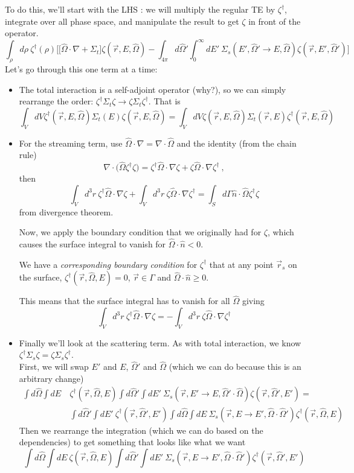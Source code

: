 \documentclass[12pt]{article}
\newcommand{\rvec}{\ensuremath{\vec{r}}}
\newcommand{\vOmega}{\ensuremath{\hat{\Omega}}}
\begin{document}
To do this, we'll start with the LHS : we will multiply the regular TE by $\zeta^{\dagger}$, integrate over all phase space, and manipulate the result to get $\zeta$ in front of the operator.
%
\[\int_{\rho} d\rho\: \zeta^{\dagger}(\rho)\biggl[ \bigl[\vOmega \cdot \nabla + \Sigma_t\bigr] \zeta(\vec{r}, E, \vOmega) - \int_{4 \pi} d\vOmega' \int_0^{\infty} dE' \: \Sigma_s(E', \vOmega' \rightarrow E, \vOmega) \zeta(\vec{r}, E', \vOmega') \biggr]\]
% 
Let's go through this one term at a time:
\begin{itemize}
\item The total interaction is a self-adjoint operator (why?), so we can simply rearrange the order: $\zeta^{\dagger} \Sigma_t \zeta \rightarrow \zeta \Sigma_t \zeta^{\dagger}$. That is
\[\int_V dV \zeta^{\dagger}(\vec{r}, E, \vOmega) \Sigma_t(E) \zeta(\vec{r}, E, \vOmega) = \int_V dV \zeta(\vec{r}, E, \vOmega) \Sigma_t(\rvec,E) \zeta^{\dagger}(\vec{r}, E, \vOmega)\]
%
\item For the streaming term, use $\vOmega \cdot \nabla = \nabla \cdot \vOmega$ and the identity (from the chain rule)
\[\nabla \cdot \bigl(\vOmega \zeta^{\dagger} \zeta \bigr) = \zeta^{\dagger}\vOmega \cdot \nabla \zeta + \zeta \vOmega \cdot \nabla \zeta^{\dagger}\:,\]
then
\[
\int_V d^3r \:\zeta^{\dagger}\vOmega \cdot \nabla \zeta + \int_V d^3r \:\zeta \vOmega \cdot \nabla \zeta^{\dagger} = \int_S d \Gamma \hat{n} \cdot \vOmega \zeta^{\dagger} \zeta
\]
from divergence theorem. 

Now, we apply the boundary condition that we originally had for $\zeta$, which causes the surface integral to vanish for $\vOmega \cdot \hat{n} < 0$.

We have a \textit{corresponding boundary condition} for $\zeta^{\dagger}$ that at any point $\rvec_s$ on the surface, $\zeta^{\dagger}(\rvec, \vOmega, E) = 0$, $\vec{r} \in \Gamma$ and $\vOmega \cdot \hat{n} \geq 0$.

This means that the surface integral has to vanish for all $\vOmega$ giving
\[
\int_V d^3r \:\zeta^{\dagger}\vOmega \cdot \nabla \zeta = -\int_V d^3r \:\zeta \vOmega \cdot \nabla \zeta^{\dagger}
\]
%
\item Finally we'll look at the scattering term. As with total interaction, we know $\zeta^{\dagger} \Sigma_s \zeta  = \zeta \Sigma_s \zeta^{\dagger}$. \\
First, we will swap $E'$ and $E$, $\vOmega'$ and $\vOmega$ (which we can do because this is an arbitrary change)
\begin{align*}
\int d\vOmega \int dE\: &\zeta^{\dagger}(\rvec, \vOmega, E) \int d\vOmega' \int dE'\: \Sigma_s(\rvec, E' \rightarrow E, \vOmega' \cdot \vOmega) \zeta(\rvec, \vOmega', E') = \\
%
&\int d\vOmega' \int dE'\: \zeta^{\dagger}(\rvec, \vOmega', E') \int d\vOmega \int dE\: \Sigma_s(\rvec, E \rightarrow E', \vOmega \cdot \vOmega') \zeta^{\dagger}(\rvec, \vOmega, E) 
\end{align*}
Then we rearrange the integration (which we can do based on the dependencies) to get something that looks like what we want
\[
\int d\vOmega \int dE\: \zeta(\rvec, \vOmega, E) \int d\vOmega' \int dE'\: \Sigma_s(\rvec, E \rightarrow E', \vOmega \cdot \vOmega') \zeta^{\dagger}(\rvec, \vOmega', E') 
\]



\end{itemize}
\end{document}
